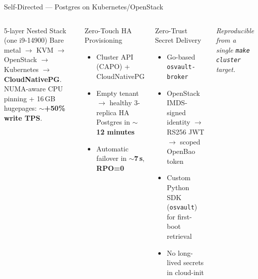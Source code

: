 \documentclass[aspectratio=169,xcolor=dvipsnames,9pt]{beamer}
\begin{document}
\begin{frame}{Self-Directed --- Postgres on Kubernetes/OpenStack}
\begin{columns}[T]
  \begin{block}{5-layer Nested Stack (one i9-14900)}
    \footnotesize
    Bare metal $\to$ KVM $\to$ OpenStack $\to$ Kubernetes $\to$ \textbf{CloudNativePG}.\\
    NUMA-aware CPU pinning + 16\,GB hugepages: \textbf{$\sim$+50\% write TPS}.
  \end{block}
  \begin{exampleblock}{Zero-Touch HA Provisioning}
    \footnotesize
    \begin{itemize}
      \item Cluster API (CAPO) + CloudNativePG
      \item Empty tenant $\to$ healthy 3-replica HA Postgres in \textbf{$\sim$12 minutes}
      \item Automatic failover in \textbf{$\sim$7\,s}, \textbf{RPO=0}
    \end{itemize}
  \end{exampleblock}

  \begin{alertblock}{Zero-Trust Secret Delivery}
    \footnotesize
    \begin{itemize}
      \item Go-based \texttt{osvault-broker}
      \item OpenStack IMDS-signed identity $\to$ RS256 JWT $\to$ scoped OpenBao token
      \item Custom Python SDK (\texttt{osvault}) for first-boot retrieval
      \item No long-lived secrets in cloud-init
    \end{itemize}
  \end{alertblock}
  \centering
  \footnotesize\itshape
  Reproducible from a single \texttt{make cluster} target.
\end{columns}
\end{frame}
\end{document}

